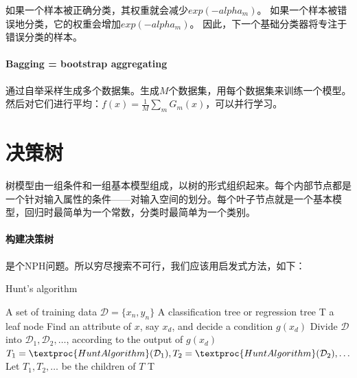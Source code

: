 如果一个样本被正确分类，其权重就会减少$exp(-alpha_m)$。
如果一个样本被错误地分类，它的权重会增加$exp(-alpha_m)$。
因此，下一个基础分类器将专注于错误分类的样本。

\paragraph{Bagging = bootstrap aggregating} 通过自举采样生成多个数据集。生成$M$个数据集，用每个数据集来训练一个模型。然后对它们进行平均：$f(x) = \frac{1}{M} \sum_m G_m(x)$，可以并行学习。

\section{决策树}
树模型由一组条件和一组基本模型组成，以树的形式组织起来。每个内部节点都是一个针对输入属性的条件——对输入空间的划分。每个叶子节点就是一个基本模型，回归时最简单为一个常数，分类时最简单为一个类别。

\paragraph{构建决策树} 是个NPH问题。所以穷尽搜索不可行，我们应该用启发式方法，如下：
\begin{algorithm}[H]
\caption{Hunt's algorithm}
\label{alg:hunt}
\begin{algorithmic}[1]
\Require A set of training data $\mathcal{D} = \{x_n, y_n\}$
\Ensure A classification tree or regression tree T
\State \Return a leaf node
\Else
\State Find an attribute of $x$, say $x_d$, and decide a condition $g(x_d)$
\State Divide $\mathcal{D}$ into $\mathcal{D}_1, \mathcal{D}_2, \ldots$, according to the output of $g(x_d)$
\State $T_1 = \textproc{HuntAlgorithm}(\mathcal{D}_1), T_2 = \textproc{HuntAlgorithm}(\mathcal{D}_2), \ldots$
\State Let $T_1, T_2, \ldots$ be the children of $T$
\EndIf
\State \Return T
\EndFunction
\end{algorithmic}
\end{algorithm}

